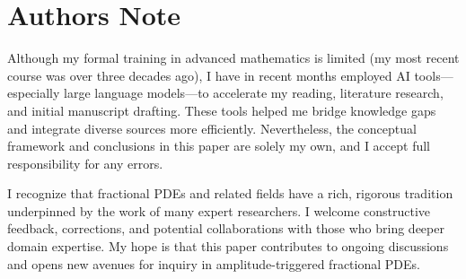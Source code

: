 \documentclass[12pt]{article}
\begin{document}
\section{Authors Note}
Although my formal training in advanced mathematics is limited (my most recent course was over three decades ago), I have in recent months employed AI tools—especially large language models—to accelerate my reading, literature research, and initial manuscript drafting. These tools helped me bridge knowledge gaps and integrate diverse sources more efficiently. Nevertheless, the conceptual framework and conclusions in this paper are solely my own, and I accept full responsibility for any errors.

I recognize that fractional PDEs and related fields have a rich, rigorous tradition underpinned by the work of many expert researchers. I welcome constructive feedback, corrections, and potential collaborations with those who bring deeper domain expertise. My hope is that this paper contributes to ongoing discussions and opens new avenues for inquiry in amplitude-triggered fractional PDEs.

\bigskip
\end{document}
